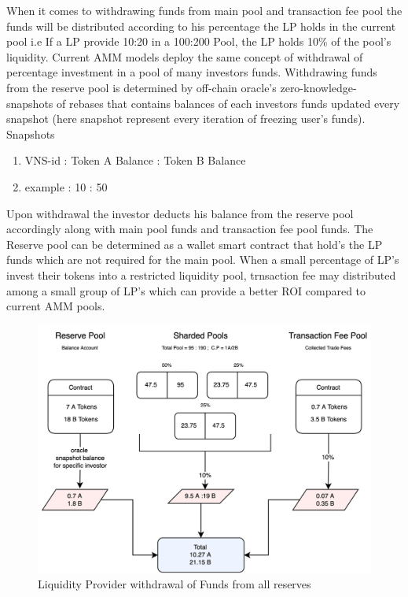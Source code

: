 \documentclass[10pt]{article}
\begin{document}
When it comes to withdrawing funds from main pool and transaction fee pool the funds will be distributed according to his percentage the LP holds in the current pool i.e If a LP provide 10:20 in a 100:200 Pool, the LP holds 10\% of the pool's liquidity. Current AMM models deploy the same concept of withdrawal of percentage investment in a pool of many investors funds. Withdrawing funds from the reserve pool is determined by off-chain oracle's zero-knowledge-snapshots of rebases that contains balances of each investors funds updated every snapshot (here snapshot represent every iteration of freezing user's funds). \\

Snapshots
\begin{enumerate}[leftmargin=+0.2in]
\item VNS-id : Token A Balance : Token B Balance
\item example : 10 : 50
\end{enumerate}

Upon withdrawal the investor deducts his balance from the reserve pool accordingly along with main pool funds and transaction fee pool funds. The Reserve pool can be determined as a wallet smart contract that hold's the LP funds which are not required for the main pool. When a small percentage of LP's invest their tokens into a restricted liquidity pool, trnsaction fee may distributed among a small group of LP's which can provide a better ROI compared to current AMM pools.

\begin{figure}[H]
\begin{center}
\includegraphics[width=13cm]{reserve-pool-4}
\caption{Liquidity Provider withdrawal of Funds from all reserves}
\end{center}
\end{figure}
\end{document}
